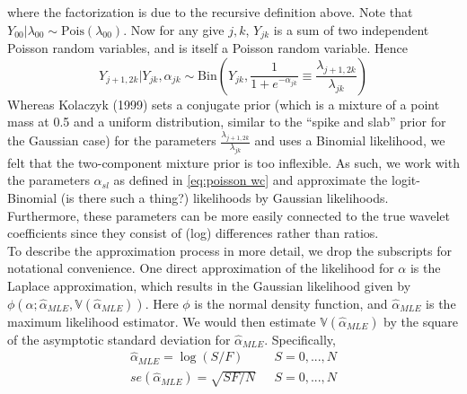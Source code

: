 \documentclass[12pt]{article}
\newcommand{\Ga}{\alpha}
\newcommand{\Gl}{\lambda}    \newcommand{\GL}{\Lambda}
\begin{document}
where the factorization is due to the recursive definition above. Note that $Y_{00}|\Gl_{00}\sim \textrm{Pois}(\Gl_{00})$. Now for any give $j,k$, $Y_{jk}$ is a sum of two independent Poisson random variables, and is itself a Poisson random variable. Hence
\[Y_{j+1,2k}|Y_{jk},\Ga_{jk}\sim \textrm{Bin}({Y_{jk},\frac{1}{1+e^{-\Ga_{jk}}}\equiv\frac{\Gl_{j+1,2k}}{\Gl_{jk}}})\]
Whereas Kolaczyk (1999) sets a conjugate prior (which is a mixture of a point mass at 0.5 and a uniform distribution, similar to the ``spike and slab'' prior for the Gaussian case) for the parameters $\frac{\Gl_{j+1,2k}}{\Gl_{jk}}$ and uses a Binomial likelihood, we felt that the two-component mixture prior is too inflexible. As such, we work with the parameters $\Ga_{sl}$ as defined in \eqref{eq:poisson wc} and approximate the logit-Binomial (is there such a thing?) likelihoods by Gaussian likelihoods. Furthermore, these parameters can be more easily connected to the true wavelet coefficients since they consist of (log) differences rather than ratios.\bigskip\\
To describe the approximation process in more detail, we drop the subscripts for notational convenience. One direct approximation of the likelihood for $\Ga$ is the Laplace approximation, which results in the Gaussian likelihood given by $\phi(\Ga;\hat{\Ga}_{MLE},\mathbb{V}(\hat{\Ga}_{MLE}))$. Here $\phi$ is the normal density function, and $\hat{\Ga}_{MLE}$ is the maximum likelihood estimator. We would then estimate $\mathbb{V}(\hat{\Ga}_{MLE})$ by the square of the asymptotic standard deviation for $\hat{\Ga}_{MLE}$. Specifically,
\begin{eqnarray}
\hat{\Ga}_{MLE}=\log(S/F)&\ \ \ S=0,...,N\\
se(\hat{\Ga}_{MLE})=\sqrt{SF/N}&\ \ \ S=0,...,N
\end{eqnarray}
\end{document}
